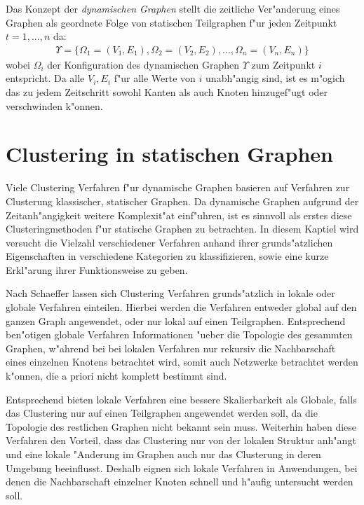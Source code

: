 \documentclass[journal]{vgtc}
\begin{document}
	Das Konzept der \emph{dynamischen Graphen}\cite{modularity} stellt die zeitliche Ver"anderung eines Graphen
	als geordnete Folge von statischen Teilgraphen f"ur jeden Zeitpunkt $t=1,...,n$ da:
	\begin{align}
		\Upsilon=\{\Omega_1=(V_1, E_1), \Omega_2=(V_2, E_2), ..., \Omega_n=(V_n,E_n)\}
	\end{align}
	wobei $\Omega_i$ der Konfiguration des dynamischen Graphen $\Upsilon$ zum Zeitpunkt $i$ entspricht.
	Da alle $V_i, E_i$ f"ur alle Werte von $i$ unabh"angig sind, ist es m"ogich das zu jedem Zeitschritt
	sowohl Kanten als auch Knoten hinzugef"ugt oder verschwinden k"onnen.
  
\section{Clustering in statischen Graphen}
  \label{sec:static_clustering}

  Viele Clustering Verfahren f"ur dynamische Graphen basieren auf Verfahren zur Clusterung klassischer,
  statischer Graphen. Da dynamische Graphen aufgrund der Zeitanh"angigkeit weitere Komplexit"at einf"uhren,
  ist es sinnvoll als erstes diese Clusteringmethoden f"ur statische Graphen zu betrachten.
  In diesem Kaptiel wird versucht die Vielzahl verschiedener Verfahren anhand ihrer grunds"atzlichen Eigenschaften
  in verschiedene Kategorien zu klassifizieren, sowie eine kurze Erkl"arung ihrer Funktionsweise zu geben.
  
  Nach Schaeffer \cite{Schaeffer} lassen sich Clustering Verfahren grunds"atzlich in lokale oder globale
  Verfahren einteilen. Hierbei werden die Verfahren entweder global auf den ganzen Graph angewendet,
  oder nur lokal auf einen Teilgraphen. Entsprechend ben"otigen globale Verfahren Informationen "ueber 
  die Topologie des gesammten Graphen, w"ahrend bei bei lokalen Verfahren nur rekursiv die Nachbarschaft
  eines einzelnen Knotens betrachtet wird, somit auch Netzwerke betrachtet werden k"onnen, die a priori
  nicht komplett bestimmt sind.
  
  Entsprechend bieten lokale Verfahren eine bessere Skalierbarkeit als Globale, falls das Clustering nur
  auf einen Teilgraphen angewendet werden soll, da die Topologie des restlichen Graphen nicht bekannt sein muss.
  Weiterhin haben diese Verfahren den Vorteil, dass das Clustering nur von der lokalen Struktur anh"angt und eine
  lokale "Anderung im Graphen auch nur das Clusterung in deren Umgebung beeinflusst. Deshalb eignen sich lokale
  Verfahren in Anwendungen, bei denen die Nachbarschaft einzelner Knoten schnell und h"aufig untersucht werden soll.
  
\end{document}
